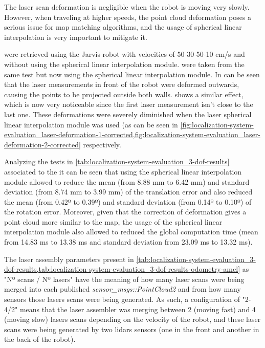 The laser scan deformation is negligible when the robot is moving very slowly. However, when traveling at higher speeds, the point cloud deformation poses a serious issue for map matching algorithms, and the usage of spherical linear interpolation is very important to mitigate it.

 were retrieved using the Jarvis robot with velocities of 50-30-50-10 cm/s and without using the spherical linear interpolation module.  were taken from the same test but now using the spherical linear interpolation module. In  can be seen that the laser measurements in front of the robot were deformed outwards, causing the points to be projected outside both walls.  shows a similar effect, which is now very noticeable since the first laser measurement isn't close to the last one. These deformations were severely diminished when the laser spherical linear interpolation module was used (as can be seen in \cref{fig:localization-system-evaluation_laser-deformation-1-corrected,fig:localization-system-evaluation_laser-deformation-2-corrected} respectively.

Analyzing the tests in \cref{tab:localization-system-evaluation_3-dof-results} associated to the  it can be seen that using the spherical linear interpolation module allowed to reduce the mean (from 8.88 mm to 6.42 mm) and standard deviation (from 8.74 mm to 3.99 mm) of the translation error and also reduced the mean (from 0.42º to 0.39º) and standard deviation (from 0.14º to 0.10º) of the rotation error. Moreover, given that the correction of deformation gives a point cloud more similar to the map, the usage of the spherical linear interpolation module also allowed to reduced the global computation time (mean from 14.83 ms to 13.38 ms and standard deviation from 23.09 ms to 13.32 ms).

The laser assembly parameters present in \cref{tab:localization-system-evaluation_3-dof-results,tab:localization-system-evaluation_3-dof-results-odometry-amcl} as "Nº scans / Nº lasers" have the meaning of how many laser scans were being merged into each published \emph{sensor\_msgs::PointCloud2} and from how many sensors those lasers scans were being generated. As such, a configuration of "2-4/2" means that the laser assembler was merging between 2 (moving fast) and 4 (moving slow) lasers scans depending on the velocity of the robot, and these laser scans were being generated by two \glspl{lidar} sensors (one in the front and another in the back of the robot).


